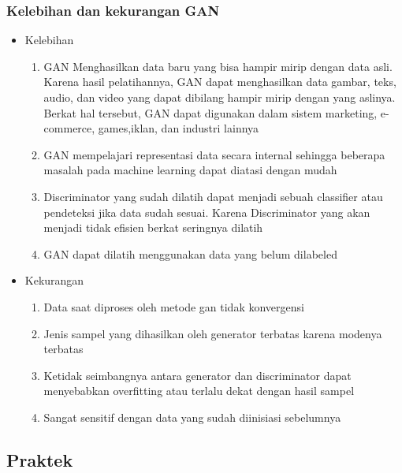 \subsubsection{Kelebihan dan kekurangan GAN} 
\hfill\break
\begin{itemize}
 \item Kelebihan 
   \begin{enumerate}
      \item GAN Menghasilkan data baru yang bisa hampir mirip dengan data asli. Karena hasil pelatihannya, GAN dapat menghasilkan data gambar, teks, audio, dan video yang dapat dibilang hampir mirip dengan yang aslinya. Berkat hal tersebut, GAN dapat digunakan dalam sistem marketing, e-commerce, games,iklan, dan industri lainnya
      \item GAN mempelajari representasi data secara internal sehingga beberapa masalah pada machine learning dapat diatasi dengan mudah
      \item Discriminator yang sudah dilatih dapat menjadi sebuah classifier atau pendeteksi jika data sudah sesuai. Karena Discriminator yang akan menjadi tidak efisien berkat seringnya dilatih
      \item GAN dapat dilatih menggunakan data yang belum dilabeled
   \end{enumerate}
 \item Kekurangan
   \begin{enumerate}  
      \item Data saat diproses oleh metode gan tidak konvergensi
      \item Jenis sampel yang dihasilkan oleh generator terbatas karena modenya terbatas
      \item Ketidak seimbangnya antara generator dan discriminator dapat menyebabkan overfitting atau terlalu dekat dengan hasil sampel
      \item Sangat sensitif dengan data yang sudah diinisiasi sebelumnya
   \end{enumerate}
\end{itemize}


\subsection{Praktek}
